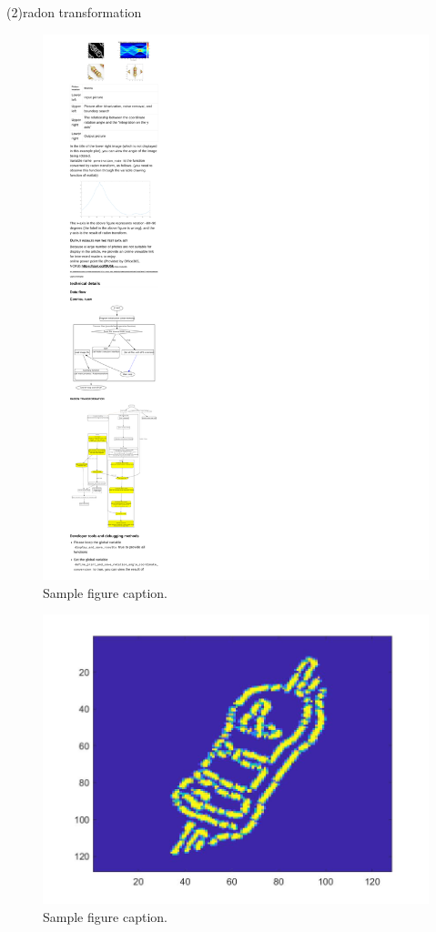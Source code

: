 \documentclass{article}
\begin{document}
(2)radon transformation

\begin{figure}
	\centering
	\includegraphics[width=0.7\linewidth]{f.pdf}
	\caption{Sample figure caption.}
	\label{fig:fpdf}
\end{figure}




\begin{figure}
	\centering
	\includegraphics[width=0.7\linewidth]{6AdnkBj.jpg}
	\caption{Sample figure caption.}
	\label{fig:6AdnkBj}
\end{figure}
\end{document}
